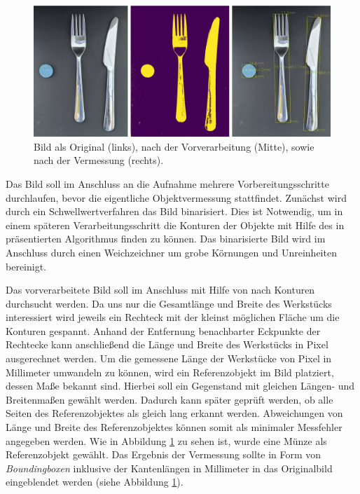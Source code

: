 \documentclass[twocolumn,10pt]{asme2ej}
\begin{document}
\begin{figure}
	\includegraphics[scale=0.07	]{output.png}
	\caption[center]{Bild als Original (links), nach der Vorverarbeitung (Mitte), sowie nach der Vermessung (rechts). }
	\label{fig:intro}
\end{figure}


Das Bild soll im Anschluss an die Aufnahme mehrere Vorbereitungsschritte durchlaufen, bevor die eigentliche Objektvermessung stattfindet. Zunächst wird durch ein Schwellwertverfahren das Bild binarisiert. Dies ist Notwendig, um in einem späteren Verarbeitungsschritt die Konturen der Objekte mit Hilfe des in \cite{Suzuki1985TopologicalSA} präsentierten Algorithmus finden zu können. Das binarisierte Bild wird im Anschluss durch einen Weichzeichner um grobe Körnungen und Unreinheiten bereinigt. 

Das vorverarbeitete Bild soll im Anschluss mit Hilfe von \cite{Suzuki1985TopologicalSA} nach Konturen durchsucht werden. Da uns nur die Gesamtlänge und Breite des Werkstücks interessiert wird jeweils ein Rechteck mit der kleinst möglichen Fläche um die Konturen gespannt. Anhand der Entfernung benachbarter Eckpunkte der Rechtecke kann anschließend die Länge und Breite des Werkstücks in Pixel ausgerechnet werden. Um die gemessene Länge der Werkstücke von Pixel in Millimeter umwandeln zu können, wird ein Referenzobjekt im Bild platziert, dessen Maße bekannt sind. Hierbei soll ein Gegenstand mit gleichen Längen- und Breitenmaßen gewählt werden. Dadurch kann später geprüft werden, ob  alle Seiten des Referenzobjektes als gleich lang erkannt werden. Abweichungen von Länge und Breite des Referenzobjektes können somit als minimaler Messfehler angegeben werden. Wie in Abbildung \ref{fig:intro} zu sehen ist, wurde eine Münze als Referenzobjekt gewählt.  Das Ergebnis der Vermessung sollte in Form von \emph{Boundingboxen} inklusive der Kantenlängen in Millimeter in das Originalbild eingeblendet werden (siehe Abbildung \ref{fig:intro}).
\end{document}
